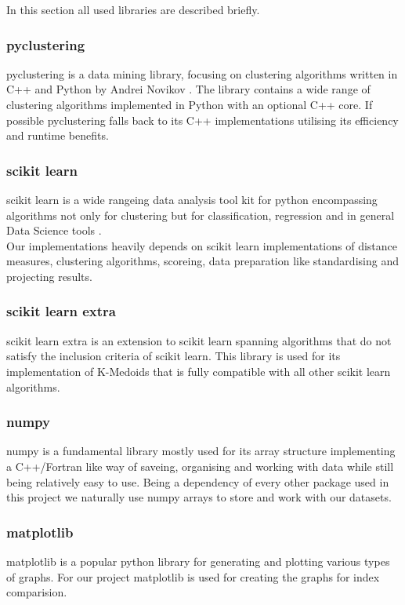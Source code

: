 In this section all used libraries are described briefly.

\subsubsection{pyclustering}
pyclustering is a data mining library, focusing on clustering algorithms written in C++ and Python by Andrei Novikov \cite{Novikov2019}. The library contains a wide range of clustering algorithms implemented in Python with an optional C++ core. If possible pyclustering falls back to its C++ implementations utilising its efficiency and runtime benefits.

\subsubsection{scikit learn}
scikit learn is a wide rangeing data analysis tool kit for python encompassing algorithms not only for clustering but for classification, regression and in general Data Science tools \cite{scikitlearn}.\\
Our implementations heavily depends on scikit learn implementations of distance measures, clustering algorithms, scoreing, data preparation like standardising and projecting results. 

\subsubsection{scikit learn extra}
scikit learn extra is an extension to scikit learn spanning algorithms that do not satisfy the inclusion criteria of scikit learn. This library is used for its implementation of K-Medoids that is fully compatible with all other scikit learn algorithms.

\subsubsection{numpy}
numpy is a fundamental library mostly used for its array structure implementing a C++/Fortran like way of saveing, organising and working with data while still being relatively easy to use. Being a dependency of every other package used in this project we naturally use numpy arrays to store and work with our datasets.

\subsubsection{matplotlib}
matplotlib is a popular python library for generating and plotting various types of graphs. For our project matplotlib is used for creating the graphs for index comparision.

